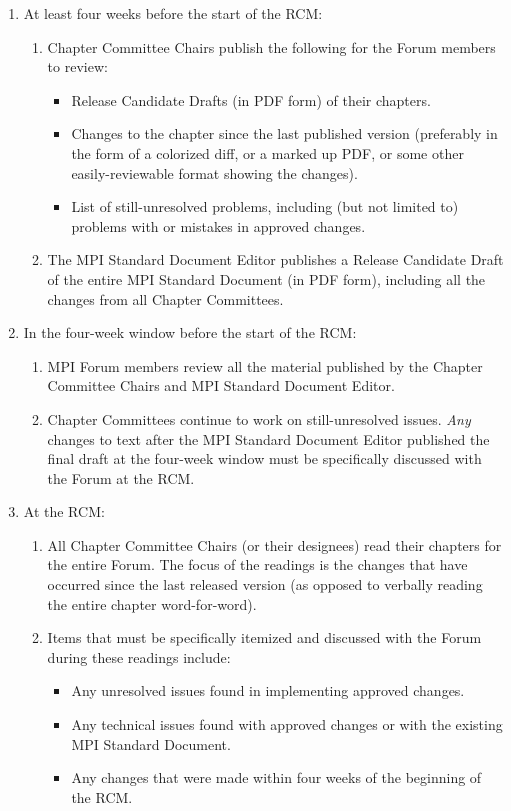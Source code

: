{{\begin{enumerate}
\item At least four weeks before the start of the RCM:
  \begin{enumerate}
  \item Chapter Committee Chairs publish the following for the Forum
    members to review:
    \begin{itemize}
      \item Release Candidate Drafts (in PDF form) of their chapters.
      \item Changes to the chapter since the last published version
        (preferably in the form of a colorized diff, or a marked up
        PDF, or some other easily-reviewable format showing the
        changes).
      \item List of still-unresolved problems, including (but not
        limited to) problems with or mistakes in approved changes.
    \end{itemize}
  \item The MPI Standard Document Editor publishes a Release Candidate
    Draft of the entire MPI Standard Document (in PDF form), including
    all the changes from all Chapter Committees.
  \end{enumerate}

\item In the four-week window before the start of the RCM:
  \begin{enumerate}
  \item MPI Forum members review all the material published by the
    Chapter Committee Chairs and MPI Standard Document Editor.
  \item Chapter Committees continue to work on still-unresolved
    issues.  {\em Any} changes to text after the MPI Standard Document
    Editor published the final draft at the four-week window must be
    specifically discussed with the Forum at the RCM.
  \end{enumerate}

\item At the RCM:
  \begin{enumerate}
  \item All Chapter Committee Chairs (or their designees) read their
    chapters for the entire Forum.  The focus of the readings is the
    changes that have occurred since the last released version (as
    opposed to verbally reading the entire chapter word-for-word).
  \item Items that must be specifically itemized and discussed with
    the Forum during these readings include:
    \begin{itemize}
    \item Any unresolved issues found in implementing approved
      changes.
    \item Any technical issues found with approved changes or with the
      existing MPI Standard Document.
    \item Any changes that were made within four weeks of the
      beginning of the RCM.
    \end{itemize}


\end{enumerate}
\end{enumerate}}}
